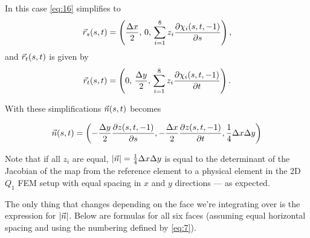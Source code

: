 \documentclass[11pt]{article}
\begin{document}
In this case \eqref{eq:16} simplifies to
\begin{equation}
\label{eq:18}
\vec r_{s}(s,t) = \left(
  \frac{\Delta x}{2},\,
  0,\,
  \sum_{i=1}^{8} z_{i} \frac{\partial \chi_{i}(s, t, -1)}{\partial s} \right),
\end{equation}
and $\vec r_{t}(s,t)$ is given by
\begin{equation}
\label{eq:18}
\vec r_{t}(s,t) = \left(
  0,\,
  \frac{\Delta y}{2},\,
  \sum_{i=1}^{8} z_{i} \frac{\partial \chi_{i}(s, t, -1)}{\partial t} \right).
\end{equation}

With these simplifications $\vec n(s,t)$ becomes

\begin{equation}
\label{eq:19}
\vec n(s,t) = \left(
-\frac{\Delta y}{2}\frac{\partial z(s,t,-1)}{\partial s},
-\frac{\Delta x}{2}\frac{\partial z(s,t,-1)}{\partial t},
\frac{1}{4} \Delta x \Delta y
\right)
\end{equation}

Note that if all $z_{i}$ are equal, $|\vec n| = \frac{1}{4} \Delta x \Delta y$ is
equal to the determinant of the Jacobian of the map from the reference
element to a physical element in the 2D $Q_{1}$ FEM setup with equal
spacing in $x$ and $y$ directions --- as expected.

The only thing that changes depending on the face we're integrating
over is the expression for $|\vec n|$. Below are formulas for all six
faces (assuming equal horizontal spacing and using the numbering
defined by \eqref{eq:7}).
\end{document}
